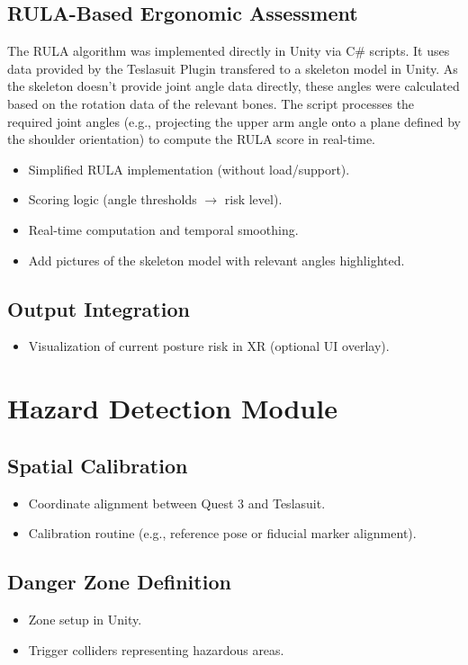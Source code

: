 \subsection{RULA-Based Ergonomic Assessment}
The RULA algorithm was implemented directly in Unity via C# scripts. It uses data provided by the Teslasuit Plugin transfered to a skeleton model in Unity. As the skeleton doesn't provide joint angle data directly, these angles were calculated based on the rotation data of the relevant bones. The script processes the required joint angles (e.g., projecting the upper arm angle onto a plane defined by the shoulder orientation) to compute the RULA score in real-time. 
\begin{itemize}
    \item Simplified RULA implementation (without load/support).
    \item Scoring logic (angle thresholds $\rightarrow$ risk level).
    \item Real-time computation and temporal smoothing.
    \item Add pictures of the skeleton model with relevant angles highlighted.
\end{itemize}

\subsection{Output Integration}
\begin{itemize}
    \item Visualization of current posture risk in XR (optional UI overlay).
\end{itemize}

\section{Hazard Detection Module}
\subsection{Spatial Calibration}
\begin{itemize}
    \item Coordinate alignment between Quest 3 and Teslasuit.
    \item Calibration routine (e.g., reference pose or fiducial marker alignment).
\end{itemize}

\subsection{Danger Zone Definition}
\begin{itemize}
    \item Zone setup in Unity.
    \item Trigger colliders representing hazardous areas.
\end{itemize}

